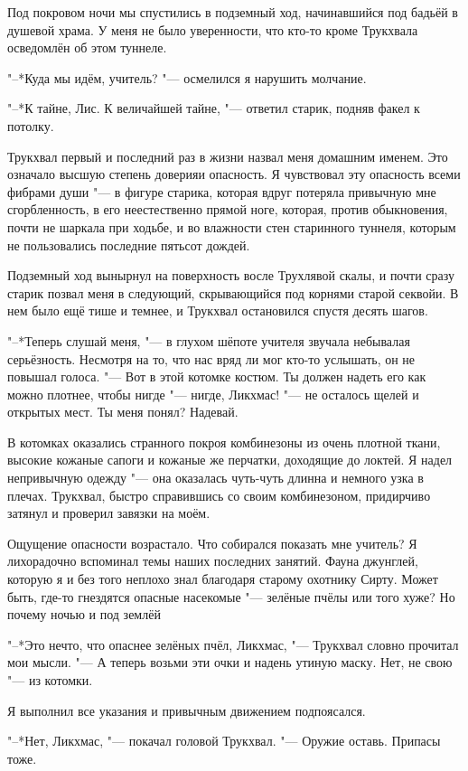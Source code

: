 Под покровом ночи мы спустились в подземный ход, начинавшийся под бадьёй в душевой храма.
У меня не было уверенности, что кто-то кроме Трукхвала осведомлён об этом туннеле.

"--*Куда мы идём, учитель? "--- осмелился я нарушить молчание.

"--*К тайне, Лис.
К величайшей тайне, "--- ответил старик, подняв факел к потолку.

Трукхвал первый и последний раз в жизни назвал меня домашним именем.
Это означало высшую степень доверия\ldotst и опасность.
Я чувствовал эту опасность всеми фибрами души "--- в фигуре старика, которая вдруг потеряла привычную мне сгорбленность, в его неестественно прямой ноге, которая, против обыкновения, почти не шаркала при ходьбе, и во влажности стен старинного туннеля, которым не пользовались последние пятьсот дождей.

Подземный ход вынырнул на поверхность восле Трухлявой скалы, и почти сразу старик позвал меня в следующий, скрывающийся под корнями старой секвойи.
В нем было ещё тише и темнее, и Трукхвал остановился спустя десять шагов.

"--*Теперь слушай меня, "--- в глухом шёпоте учителя звучала небывалая серьёзность.
Несмотря на то, что нас вряд ли мог кто-то услышать, он не повышал голоса.
"--- Вот в этой котомке костюм.
Ты должен надеть его как можно плотнее, чтобы нигде "--- нигде, Ликхмас! "--- не осталось щелей и открытых мест.
Ты меня понял?
Надевай.

В котомках оказались странного покроя комбинезоны из очень плотной ткани, высокие кожаные сапоги и кожаные же перчатки, доходящие до локтей.
Я надел непривычную одежду "--- она оказалась чуть-чуть длинна и немного узка в плечах.
Трукхвал, быстро справившись со своим комбинезоном, придирчиво затянул и проверил завязки на моём.

Ощущение опасности возрастало.
Что собирался показать мне учитель?
Я лихорадочно вспоминал темы наших последних занятий.
Фауна джунглей, которую я и без того неплохо знал благодаря старому охотнику Сирту.
Может быть, где-то гнездятся опасные насекомые "--- зелёные пчёлы или того хуже?
Но почему ночью и под землёй\ldotsq

"--*Это нечто, что опаснее зелёных пчёл, Ликхмас, "--- Трукхвал словно прочитал мои мысли.
"--- А теперь возьми эти очки и надень утиную маску.
Нет, не свою "--- из котомки.

Я выполнил все указания и привычным движением подпоясался.

"--*Нет, Ликхмас, "--- покачал головой Трукхвал.
"--- Оружие оставь.
Припасы тоже.

